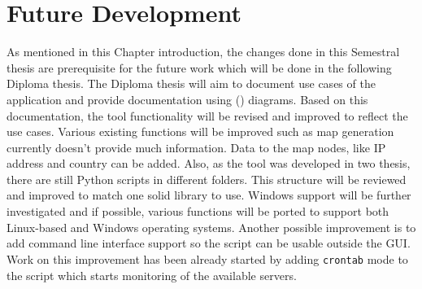 \section{Future Development}
As mentioned in this Chapter introduction, the changes done in this Semestral thesis are prerequisite for the future work which will be done in the following Diploma thesis. The Diploma thesis will aim to document use cases of the application and provide documentation using  () diagrams. Based on this documentation, the tool functionality  will be revised and improved to reflect the use cases. Various existing functions will be improved such as map generation currently doesn't provide much information. Data to the map nodes, like IP address and country can be added. Also, as the tool was developed in two thesis, there are still Python scripts in different folders. This structure will be reviewed and improved to match one solid library to use. Windows support will be further investigated and if possible, various functions will be ported to support both Linux-based and Windows operating systems. Another possible improvement is to add command line interface support so the script can be usable outside the GUI. Work on this improvement has been already started by adding \texttt{crontab} mode to the script which starts monitoring of the available servers. 